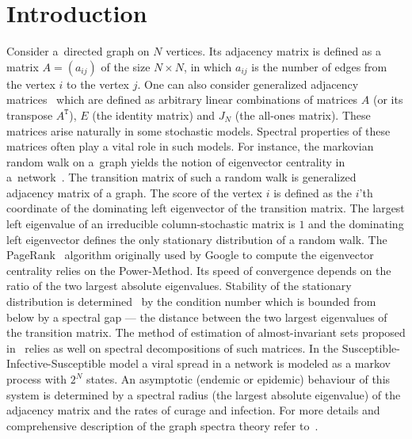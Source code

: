 \documentclass[a4paper]{jpconf}
\begin{document}
\section{Introduction}
Consider a~directed graph on \( N \) vertices.
Its adjacency matrix is defined as
    a matrix
    \( A = (a_{ij}) \)
    of the size \( N\times N \),
    in which \( a_{ij} \)
    is the number of edges
    from the vertex \( i \)
    to the vertex \( j \).
One can also consider generalized
    adjacency matrices~\cite{van2003graphs}
    which are defined as
    arbitrary linear combinations
    of matrices \( A \) (or its transpose \( A^\mathtt{T} \)),
    \( E \) (the identity matrix)
    and \( J_N \) (the all-ones matrix).
These matrices arise naturally
    in some stochastic models.
Spectral  properties of these matrices
    often play a vital role in such models.
For instance, the markovian random walk on a~graph
    yields the notion of eigenvector centrality
    in a~network~\cite{bonacich1972factoring}.
The transition matrix of such a random walk
    is generalized adjacency matrix of a graph.
The score of the vertex \( i \)
    is defined as the \( i \)'th coordinate
    of the dominating left eigenvector
    of the transition matrix.
The largest left eigenvalue of an irreducible column-stochastic matrix
    is \( 1 \) and the dominating left eigenvector
    defines the only stationary distribution
    of a random walk.
The PageRank~\cite{ilprints422} algorithm
    originally used by Google
    to compute the eigenvector centrality
    relies on the Power-Method.
Its speed of convergence depends on
    the ratio of the two largest absolute eigenvalues.
Stability of the stationary distribution
    is determined~\cite{meyer1994sensitivity}
    by the condition number
    which is bounded from below
    by a spectral gap --- the distance between
    the two largest eigenvalues
    of the transition matrix.
The method of estimation of almost-invariant sets
    proposed in~\cite{schwartz2006fluctuation}
    relies as well on spectral decompositions of such matrices.
In the Susceptible-Infective-Susceptible model
    a viral spread in a network
    is modeled as a markov process
    with \( 2^N \) states.
An asymptotic (endemic or epidemic) behaviour of this system
    is determined by a spectral radius (the largest absolute eigenvalue)
    of the adjacency matrix
    and the rates of curage and infection.
For more details and comprehensive description
    of the graph spectra theory
    refer to~\cite{cvetkovic1980spectra,godsil2013algebraic}.
\end{document}
